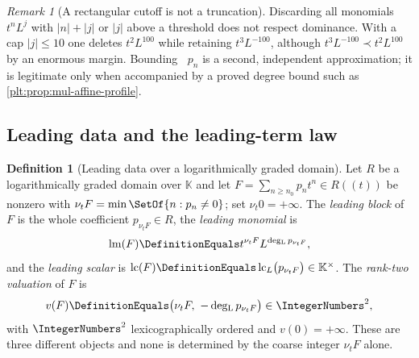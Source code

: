 \documentclass[11pt,oneside]{article}
\theoremstyle{plain}
\theoremstyle{definition}
\newtheorem{definition}[theorem]{Definition}
\theoremstyle{remark}
\newtheorem{remark}[theorem]{Remark}
\newcommand{\K}{\mathbb{K}}
\newcommand{\ordt}{\nu_{t}}                              %
\DeclareMathOperator{\lm}{lm}
\DeclareMathOperator{\lc}{lc}
\DeclareMathOperator{\degL}{deg_{L}}
\newcommand{\precdom}{\prec}
\begin{document}
\begin{remark}[A rectangular cutoff is not a truncation]
\label{plt:rmk:mul-rectangular-cutoff}
Discarding all monomials $t^nL^j$ with $|n|+|j|$ or $|j|$ above a threshold
does not respect dominance.  With a cap $|j|\le10$ one deletes $t^2L^{100}$
while retaining $t^3L^{-100}$, although
$t^3L^{-100}\precdom t^2L^{100}$ by an enormous margin.  Bounding
$\degL p_n$ is a second, independent approximation; it is legitimate only
when accompanied by a proved degree bound such as
\cref{plt:prop:mul-affine-profile}.
\end{remark}

\subsection{Leading data and the leading-term law}
\label{plt:sec:mul-leading}

\begin{definition}[Leading data over a logarithmically graded domain]
\label{plt:def:mul-leading-data}
Let $R$ be a logarithmically graded domain over $\K$ and let
$F=\sum_{n\ge n_0}p_nt^n\in R((t))$ be nonzero with
$\ordt F=\min\SetOf{n:p_n\ne0}$; set $\ordt0=+\infty$.  The
\emph{leading block} of $F$ is the whole coefficient $p_{\ordt F}\in R$, the
\emph{leading monomial} is
\begin{equation}\label{plt:eq:mul-leading-monomial}
 \lm(F)\DefinitionEquals t^{\ordt F}L^{\degL p_{\ordt F}},
\end{equation}
and the \emph{leading scalar} is
$\lc(F)\DefinitionEquals\lc_L\bigl(p_{\ordt F}\bigr)\in\K^\times$.  The
\emph{rank-two valuation} of $F$ is
\begin{equation}\label{plt:eq:mul-rank-two}
 v(F)\DefinitionEquals\bigl(\ordt F,\ -\degL p_{\ordt F}\bigr)
 \in\IntegerNumbers^2,
\end{equation}
with $\IntegerNumbers^2$ lexicographically ordered and $v(0)=+\infty$.  These
are three different objects and none is determined by the coarse integer
$\ordt F$ alone.
\end{definition}
\end{document}
